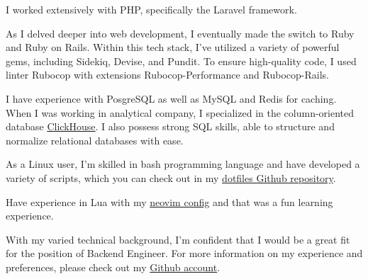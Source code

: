 
\begin{cvparagraph}

I worked extensively with PHP, specifically the Laravel framework. 

As I delved deeper into web development, I eventually made the switch to Ruby and Ruby on Rails.
Within this tech stack, I've utilized a variety of powerful gems, including Sidekiq, Devise, and Pundit. 
To ensure high-quality code, I used linter Rubocop with extensions Rubocop-Performance and Rubocop-Rails.

I have experience with PosgreSQL as well as MySQL and Redis for caching.
When I was working in analytical company, I specialized in the column-oriented database \href{https://clickhouse.com/}{ClickHouse}.
I also possess strong SQL skills, able to structure and normalize relational databases with ease.

As a Linux user, I'm skilled in bash programming language and have developed a variety
of scripts, which you can check out in my \href{https://github.com/wittyjudge/dotfiles/tree/master/.local/bin}{dotfiles Github repository}.

Have experience in Lua with my \href{https://github.com/WIttyJudge/dotfiles/tree/master/.config/nvim}{neovim config} and that was a fun learning experience.

With my varied technical background, I'm confident that I would be a great fit for the position of Backend Engineer.
For more information on my experience and preferences, please check out my \href{https://github.com/wittyjudge}{Github account}.

\end{cvparagraph}
